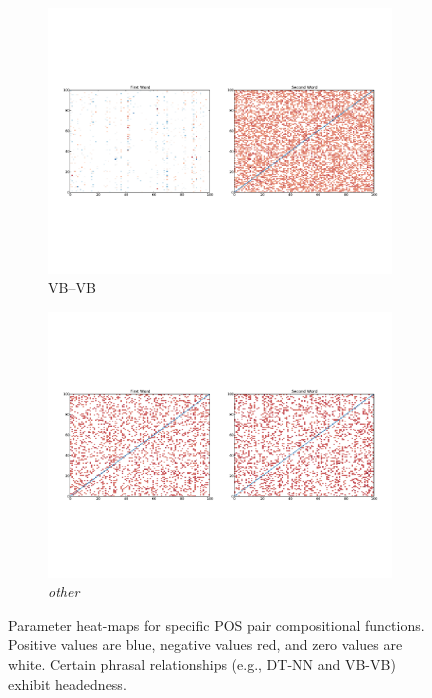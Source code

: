 \documentclass[11pt]{article}
\begin{document}
\begin{figure}[t!]
	\begin{center}
	\begin{subfigure}{\columnwidth}
		\centering
		\includegraphics[width=\columnwidth,keepaspectratio=true]{./vb_vb.pdf}		
		\caption {\small VB--VB}
		\label{fig:vb_vb}
	\end{subfigure}
	\begin{subfigure}{\columnwidth}
		\centering
		\includegraphics[width=0.95\columnwidth,keepaspectratio=true]{./x_x.pdf}	
		\caption{\small \emph{other}}
		\label{fig:x_x}			
	\end{subfigure}
	\end{center}	
	\caption{Parameter heat-maps for specific POS pair compositional functions. Positive values are blue, negative values red, and zero values are white. Certain phrasal relationships (e.g., DT-NN and VB-VB) exhibit headedness.}
	\label{fig:heatmaps}
\end{figure}
\end{document}

